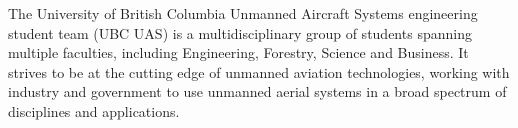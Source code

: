 \begin{flushleft}
{The University of British Columbia Unmanned Aircraft Systems engineering student team (UBC UAS) is a multidisciplinary group of students spanning multiple faculties, including Engineering, Forestry, Science and Business. It strives to be at the cutting edge of unmanned aviation technologies, working with industry and government to use unmanned aerial systems in a broad spectrum of disciplines and applications.}
\end{flushleft}

\endinput

